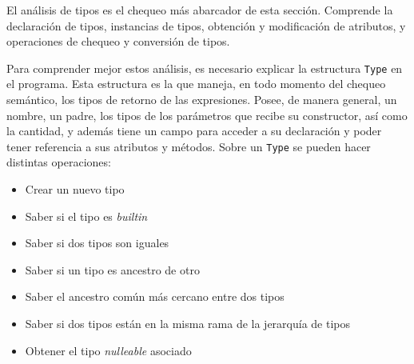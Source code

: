 \documentclass{llncs}
\begin{document}
El análisis de tipos es el chequeo más abarcador de esta sección. Comprende la declaración de tipos, instancias de tipos, obtención y modificación de atributos, y operaciones de chequeo y conversión de tipos.

Para comprender mejor estos análisis, es necesario explicar la estructura \texttt{Type} en el programa. Esta estructura es la que maneja, en todo momento del chequeo semántico, los tipos de retorno de las expresiones. Posee, de manera general, 
un nombre, un padre, los tipos de los parámetros que recibe su constructor, así como la cantidad, y además tiene un campo para acceder a su declaración y poder tener referencia a sus atributos y métodos. Sobre un \texttt{Type} se pueden hacer distintas 
operaciones: 
\begin{itemize}
    \item Crear un nuevo tipo
    \item Saber si el tipo es \textit{builtin}
    \item Saber si dos tipos son iguales
    \item Saber si un tipo es ancestro de otro
    \item Saber el ancestro común más cercano entre dos tipos 
    \item Saber si dos tipos están en la misma rama de la jerarquía de tipos 
    \item Obtener el tipo \textit{nulleable} asociado
\end{itemize}
\end{document}
